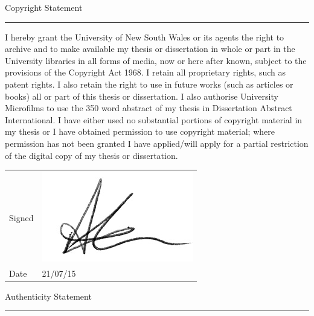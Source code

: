 
\begin{copyright-statement}

\begin{center}
\Large Copyright Statement \\
\vspace{0.7cm}
\hrule

\end{center}
\vspace{1cm}

\normalsize

I hereby grant the University of New South Wales or its agents the right to archive and to make available my thesis or dissertation in whole or part in the University libraries in all forms of media, now or here after known, subject to the provisions of the Copyright Act 1968. I retain all proprietary rights, such as patent rights. I also retain the right to use in future works (such as articles or books) all or part of this thesis or dissertation. I also authorise University Microfilms to use the 350 word abstract of my thesis in Dissertation Abstract International. I have either used no substantial portions of copyright material in my thesis or I have obtained permission to use copyright material; where permission has not been granted I have applied/will apply for a partial restriction of the digital copy of my thesis or dissertation.


\vspace{1cm}

\begin{tabular}[h!]{lp{6cm}}
  Signed & \includegraphics[height=1.5\baselineskip]{Copyright/sig-crop} \\
  Date & 21/07/15
\end{tabular}

\vspace{2cm}

\begin{center}
\Large\filcenter Authenticity Statement \\
\vspace{0.7cm}
\hrule


\end{center}
\end{copyright-statement}
